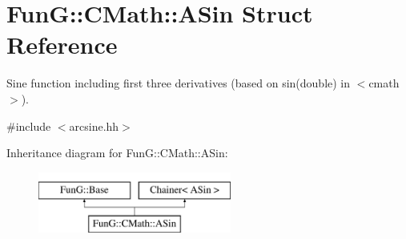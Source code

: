 \hypertarget{structFunG_1_1CMath_1_1ASin}{\section{Fun\-G\-:\-:C\-Math\-:\-:A\-Sin Struct Reference}
\label{structFunG_1_1CMath_1_1ASin}
}


Sine function including first three derivatives (based on sin(double) in $<$cmath$>$).  




{\ttfamily \#include $<$arcsine.\-hh$>$}

Inheritance diagram for Fun\-G\-:\-:C\-Math\-:\-:A\-Sin\-:\begin{figure}[H]
\begin{center}
\leavevmode
\includegraphics[height=2.000000cm]{structFunG_1_1CMath_1_1ASin}
\end{center}
\end{figure}
